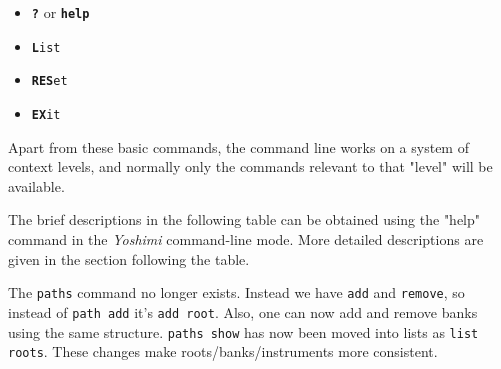    \begin{itemize}
      \item \texttt{\textbf{?}} or \texttt{\textbf{help}}
      \item \texttt{\textbf{L}ist}
      \item \texttt{\textbf{RES}et}
      \item \texttt{\textbf{EX}it}
   \end{itemize}

   Apart from these basic commands, the command line works on a system of
   context levels, and normally only the commands relevant to that "level" will
   be available.

   The brief descriptions in the following table can be obtained
   using the "help" command in the \textsl{Yoshimi} command-line mode.
   More detailed descriptions are given in the section following the table.

   The \texttt{paths} command no longer exists. Instead we have \texttt{add}
   and \texttt{remove}, so instead of \texttt{path add} it's \texttt{add root}.
   Also, one can now add and remove banks using the same structure.
   \texttt{paths show} has now been moved into lists as \texttt{list roots}.
   These changes make roots/banks/instruments more consistent.

